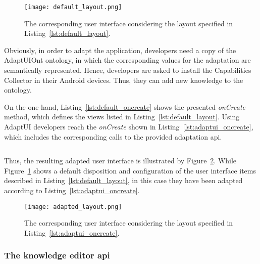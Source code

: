 \inputminted[linenos=true, fontsize=\footnotesize, frame=lines]{xml}{5_experiments_and_results/default_layout.xml}

\inputminted[linenos=true, fontsize=\footnotesize, frame=lines]{java}{5_experiments_and_results/default_oncreate.java}

\begin{figure}
\centering
\texttt{[image: default\_layout.png]}
\caption{The corresponding user interface considering the layout specified in
Listing~\ref{lst:default_layout}.}
\label{fig:default_layout}
\end{figure}

Obviously, in order to adapt the application, developers need a copy of the
AdaptUIOnt ontology, in which the corresponding values for the adaptation are
semantically represented. Hence, developers are asked to install the Capabilities 
Collector in their Android devices. Thus, they can add new knowledge to the ontology.

On the one hand, Listing~\ref{lst:default_oncreate} shows the presented 
\textit{onCreate} method, which defines the views listed in Listing~\ref{lst:default_layout}.
Using AdaptUI developers reach the \textit{onCreate} shown in Listing~\ref{lst:adaptui_oncreate},
which includes the corresponding calls to the provided adaptation \ac{api}.

\inputminted[linenos=true, fontsize=\footnotesize, frame=lines]{java}{5_experiments_and_results/adaptui_oncreate.java}

Thus, the resulting adapted user interface is illustrated by Figure~\ref{fig:adapted_layout}.
While Figure~\ref{fig:default_layout} shows a default disposition and configuration
of the user interface items described in Listing~\ref{lst:default_layout}, in this
case they have been adapted according to Listing~\ref{lst:adaptui_oncreate}.

\begin{figure}
\centering
\texttt{[image: adapted\_layout.png]}
\caption{The corresponding user interface considering the layout specified in
Listing~\ref{lst:adaptui_oncreate}.}
\label{fig:adapted_layout}
\end{figure}



\subsubsection{The knowledge editor \ac{api}}
\label{sec:knowledge_api}

